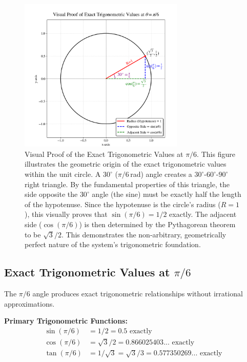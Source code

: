 \documentclass[11pt]{article}
\begin{document}
\begin{figure}[h!]
\centering
\includegraphics[width=0.7\textwidth]{figures/trigonometric-fig.png}
\caption{Visual Proof of the Exact Trigonometric Values at $\pi/6$. This figure illustrates the geometric origin of the exact trigonometric values within the unit circle. A $30^\circ$ ($\pi/6$\,rad) angle creates a $30^\circ$-$60^\circ$-$90^\circ$ right triangle. By the fundamental properties of this triangle, the side opposite the $30^\circ$ angle (the sine) must be exactly half the length of the hypotenuse. Since the hypotenuse is the circle's radius ($R=1$), this visually proves that $\sin(\pi/6) = 1/2$ exactly. The adjacent side ($\cos(\pi/6)$) is then determined by the Pythagorean theorem to be $\sqrt{3}/2$. This demonstrates the non-arbitrary, geometrically perfect nature of the system's trigonometric foundation.}
\label{fig:trigonometric_proof}
\end{figure}

\subsection{Exact Trigonometric Values at \texorpdfstring{$\pi/6$}{pi/6}}
The $\pi/6$ angle produces exact trigonometric relationships without irrational approximations.

\textbf{Primary Trigonometric Functions:}
\begin{align*}
\sin(\pi/6) &= 1/2 = 0.5 \text{ exactly} \\
\cos(\pi/6) &= \sqrt{3}/2 = 0.866025403... \text{ exactly} \\
\tan(\pi/6) &= 1/\sqrt{3} = \sqrt{3}/3 = 0.577350269... \text{ exactly}
\end{align*}
\end{document}
